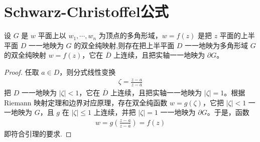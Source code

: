\documentclass[../../main.tex]{subfiles}%
\begin{document}
\section{Schwarz-Christoffel公式}

\begin{lemma}\label{lemma:复变引理7.4.1}
设 \(G\) 是 \(w\) 平面上以 \(w_1,\cdots,w_n\) 为顶点的多角形域，\(w=f(z)\) 是把 \(z\) 平面的上半平面 \(D\) 一一地映为 \(G\) 的双全纯映射,则存在把上半平面 \(D\) 一一地映为多角形域 \(G\) 的双全纯映射 \(w=f(z)\)，它在 \(\overline{D}\) 上连续，且把实轴一一地映为 \(\partial G\)。
\end{lemma}
\begin{proof}
任取 \(a \in D\)，则分式线性变换
\begin{align*}
\zeta = \frac{z-a}{z-\overline{a}}
\end{align*}
把 \(D\) 一一地映为 \(|\zeta|<1\)，它在 \(\overline{D}\) 上连续，且把实轴一一地映为 \(|\zeta|=1\)。根据 Riemann 映射定理和边界对应原理，存在双全纯函数 \(w=g(\zeta)\)，它把 \(|\zeta|<1\) 一一地映为 \(G\)，且 \(g\) 在 \(|\zeta| \leqslant 1\) 上连续，并把 \(|\zeta|=1\) 一一地映为 \(\partial G\)。于是，函数
\begin{align*}
w = g\left( \frac{z-a}{z-\overline{a}} \right) = f(z)
\end{align*}
即符合引理的要求.
\end{proof}
\end{document}
